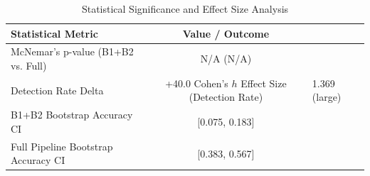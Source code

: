 \begin{table}[h]
\centering
\caption{Statistical Significance and Effect Size Analysis}
\label{tab:semantic_stats}
\begin{tabular}{lc}
\hline
\textbf{Statistical Metric} & \textbf{Value / Outcome} \\ \hline
McNemar's p-value (B1+B2 vs. Full) & N/A (N/A) \\
Detection Rate Delta & +40.0%
Cohen's $h$ Effect Size (Detection Rate) & 1.369 (large) \\
B1+B2 Bootstrap Accuracy CI & [0.075, 0.183] \\
Full Pipeline Bootstrap Accuracy CI & [0.383, 0.567] \\
\hline
\end{tabular}
\end{table}
